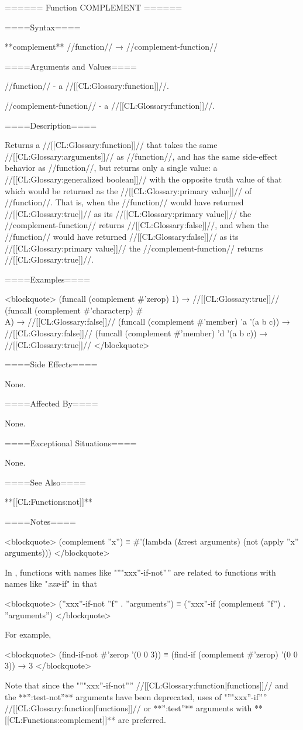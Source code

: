====== Function COMPLEMENT ======

====Syntax====

**complement** //function// → //complement-function//

====Arguments and Values====

//function// - a //[[CL:Glossary:function]]//.

//complement-function// - a //[[CL:Glossary:function]]//.

====Description====

Returns a //[[CL:Glossary:function]]// that takes the same //[[CL:Glossary:arguments]]// as //function//, and has the same side-effect behavior as //function//, but returns only a single value: a //[[CL:Glossary:generalized boolean]]// with the opposite truth value of that which would be returned as the //[[CL:Glossary:primary value]]// of //function//. That is, when the //function// would have returned //[[CL:Glossary:true]]// as its //[[CL:Glossary:primary value]]// the //complement-function// returns //[[CL:Glossary:false]]//, and when the //function// would have returned //[[CL:Glossary:false]]// as its //[[CL:Glossary:primary value]]// the //complement-function// returns //[[CL:Glossary:true]]//.

====Examples====

<blockquote> (funcall (complement #'zerop) 1) → //[[CL:Glossary:true]]// (funcall (complement #'characterp) #\\A) → //[[CL:Glossary:false]]// (funcall (complement #'member) 'a '(a b c)) → //[[CL:Glossary:false]]// (funcall (complement #'member) 'd '(a b c)) → //[[CL:Glossary:true]]// </blockquote>

====Side Effects====

None.

====Affected By====

None.

====Exceptional Situations====

None.

====See Also====

**[[CL:Functions:not]]**

====Notes====

<blockquote> (complement ''x'') ≡ #'(lambda (&rest arguments) (not (apply ''x'' arguments))) </blockquote>

In \clisp, functions with names like "''"xxx''-if-not'''' are related to functions with names like "\f{{\it xxx}-if}" in that

<blockquote> (''xxx''-if-not ''f'' . ''arguments'') ≡ (''xxx''-if (complement ''f'') . ''arguments'') </blockquote>

For example,

<blockquote> (find-if-not #'zerop '(0 0 3)) ≡ (find-if (complement #'zerop) '(0 0 3)) → 3 </blockquote>

Note that since the "''"xxx''-if-not'''' //[[CL:Glossary:function|functions]]// and the **'':test-not''** arguments have been deprecated, uses of "''"xxx''-if'''' //[[CL:Glossary:function|functions]]// or **'':test''** arguments with **[[CL:Functions:complement]]** are preferred.



